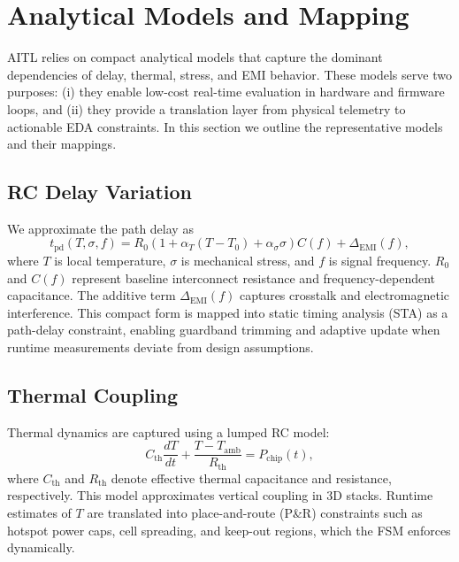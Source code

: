 \documentclass[conference]{IEEEtran}
\begin{document}
\section{Analytical Models and Mapping}

AITL relies on compact analytical models that capture the dominant dependencies of delay, thermal, stress, and EMI behavior. These models serve two purposes: (i) they enable low-cost real-time evaluation in hardware and firmware loops, and (ii) they provide a translation layer from physical telemetry to actionable EDA constraints. In this section we outline the representative models and their mappings.

\subsection{RC Delay Variation}
We approximate the path delay as
\begin{equation}
t_{\mathrm{pd}}(T,\sigma,f)=
R_0\!\left(1+\alpha_T(T-T_0)+\alpha_\sigma\sigma\right)C(f)+\Delta_{\mathrm{EMI}}(f),
\label{eq:rc}
\end{equation}
where $T$ is local temperature, $\sigma$ is mechanical stress, and $f$ is signal frequency. $R_0$ and $C(f)$ represent baseline interconnect resistance and frequency-dependent capacitance. The additive term $\Delta_{\mathrm{EMI}}(f)$ captures crosstalk and electromagnetic interference.  
This compact form is mapped into static timing analysis (STA) as a path-delay constraint, enabling guardband trimming and adaptive update when runtime measurements deviate from design assumptions.

\subsection{Thermal Coupling}
Thermal dynamics are captured using a lumped RC model:
\begin{equation}
C_{\mathrm{th}}\frac{dT}{dt}+\frac{T-T_{\mathrm{amb}}}{R_{\mathrm{th}}}=P_{\mathrm{chip}}(t),
\label{eq:thermal}
\end{equation}
where $C_{\mathrm{th}}$ and $R_{\mathrm{th}}$ denote effective thermal capacitance and resistance, respectively. This model approximates vertical coupling in 3D stacks. Runtime estimates of $T$ are translated into place-and-route (P\&R) constraints such as hotspot power caps, cell spreading, and keep-out regions, which the FSM enforces dynamically.
\end{document}
